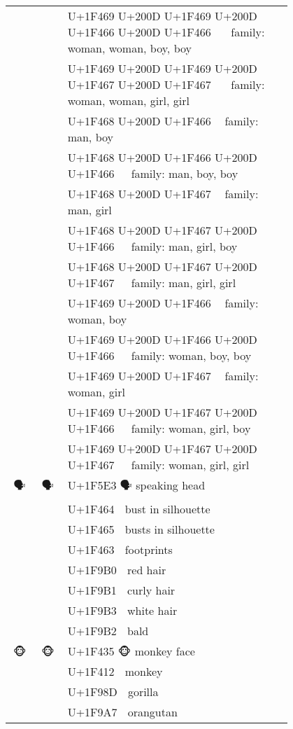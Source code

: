 \documentclass[a4paper,12pt]{ltjarticle}
\newcommand{\fontA}[1]{{\fontspec[RawFeature={mode=harf,+dist,+ccmp}]{Segoe UI Emoji} #1}}
\newcommand{\fontB}[1]{{\fontspec[RawFeature={mode=harf,+dist,+ccmp}]{Noto Color Emoji} #1}}
\begin{document}
\begin{longtable}[c]{ccp{0.8\linewidth}}
\fontA{👩‍👩‍👦‍👦}&\fontB{👩‍👩‍👦‍👦}&U+1F469 U+200D U+1F469 U+200D U+1F466 U+200D U+1F466 👩‍👩‍👦‍👦 family: woman, woman, boy, boy\\
\fontA{👩‍👩‍👧‍👧}&\fontB{👩‍👩‍👧‍👧}&U+1F469 U+200D U+1F469 U+200D U+1F467 U+200D U+1F467 👩‍👩‍👧‍👧 family: woman, woman, girl, girl\\
\fontA{👨‍👦}&\fontB{👨‍👦}&U+1F468 U+200D U+1F466 👨‍👦 family: man, boy\\
\fontA{👨‍👦‍👦}&\fontB{👨‍👦‍👦}&U+1F468 U+200D U+1F466 U+200D U+1F466 👨‍👦‍👦 family: man, boy, boy\\
\fontA{👨‍👧}&\fontB{👨‍👧}&U+1F468 U+200D U+1F467 👨‍👧 family: man, girl\\
\fontA{👨‍👧‍👦}&\fontB{👨‍👧‍👦}&U+1F468 U+200D U+1F467 U+200D U+1F466 👨‍👧‍👦 family: man, girl, boy\\
\fontA{👨‍👧‍👧}&\fontB{👨‍👧‍👧}&U+1F468 U+200D U+1F467 U+200D U+1F467 👨‍👧‍👧 family: man, girl, girl\\
\fontA{👩‍👦}&\fontB{👩‍👦}&U+1F469 U+200D U+1F466 👩‍👦 family: woman, boy\\
\fontA{👩‍👦‍👦}&\fontB{👩‍👦‍👦}&U+1F469 U+200D U+1F466 U+200D U+1F466 👩‍👦‍👦 family: woman, boy, boy\\
\fontA{👩‍👧}&\fontB{👩‍👧}&U+1F469 U+200D U+1F467 👩‍👧 family: woman, girl\\
\fontA{👩‍👧‍👦}&\fontB{👩‍👧‍👦}&U+1F469 U+200D U+1F467 U+200D U+1F466 👩‍👧‍👦 family: woman, girl, boy\\
\fontA{👩‍👧‍👧}&\fontB{👩‍👧‍👧}&U+1F469 U+200D U+1F467 U+200D U+1F467 👩‍👧‍👧 family: woman, girl, girl\\
\fontA{🗣}&\fontB{🗣}&U+1F5E3 🗣 speaking head\\
\fontA{👤}&\fontB{👤}&U+1F464 👤 bust in silhouette\\
\fontA{👥}&\fontB{👥}&U+1F465 👥 busts in silhouette\\
\fontA{👣}&\fontB{👣}&U+1F463 👣 footprints\\
\fontA{🦰}&\fontB{🦰}&U+1F9B0 🦰 red hair\\
\fontA{🦱}&\fontB{🦱}&U+1F9B1 🦱 curly hair\\
\fontA{🦳}&\fontB{🦳}&U+1F9B3 🦳 white hair\\
\fontA{🦲}&\fontB{🦲}&U+1F9B2 🦲 bald\\
\fontA{🐵}&\fontB{🐵}&U+1F435 🐵 monkey face\\
\fontA{🐒}&\fontB{🐒}&U+1F412 🐒 monkey\\
\fontA{🦍}&\fontB{🦍}&U+1F98D 🦍 gorilla\\
\fontA{🦧}&\fontB{🦧}&U+1F9A7 🦧 orangutan\\

\end{longtable}
\end{document}
